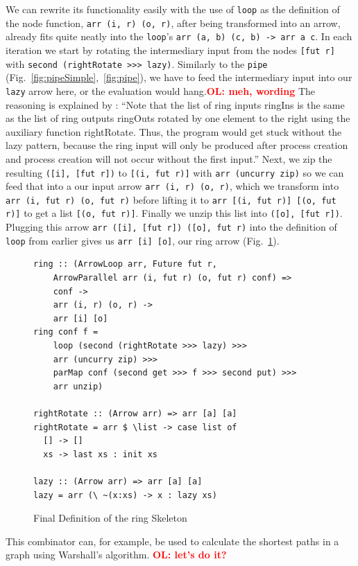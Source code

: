 \documentclass{jfp1}
\renewcommand{\cite}[1]{\citep{#1}}
\newcommand{\inlinecode}[1]{\texttt{#1}}
\newcommand{\comm}[2]{\textcolor{red}{\bfseries #1: #2}}
\newcommand{\olcomment}[1]{\comm{OL}{#1}}
\begin{document}
We can rewrite its functionality easily with the use of \inlinecode{loop} as the definition of the node function, \inlinecode{arr (i, r) (o, r)}, after being transformed into an arrow, already fits quite neatly into the \inlinecode{loop}'s \inlinecode{arr (a, b) (c, b) -> arr a c}. In each iteration we start by rotating the intermediary input from the nodes \inlinecode{[fut r]} with \inlinecode{second (rightRotate >>> lazy)}. Similarly to the \inlinecode{pipe} (Fig.~\ref{fig:pipeSimple},~\ref{fig:pipe}), we have to feed the intermediary input into our \inlinecode{lazy} arrow here, or the evaluation would hang.\olcomment{meh, wording} The reasoning is explained by \citet{Loogen2012}:
\enquote{Note that the list of ring inputs ringIns is the same as the list of ring outputs ringOuts rotated by one element to the right using the auxiliary function rightRotate. Thus, the program would get stuck without the lazy pattern, because the ring input will only be produced after process creation and process creation will not occur without the first input.}
Next, we zip the resulting \inlinecode{([i], [fut r])} to \inlinecode{[(i, fut r)]} with \inlinecode{arr (uncurry zip)} so we can feed that into a our input arrow \inlinecode{arr (i, r) (o, r)}, which we transform into \inlinecode{arr (i, fut r) (o, fut r)} before lifting it to \inlinecode{arr [(i, fut r)] [(o, fut r)]} to get a list \inlinecode{[(o, fut r)]}. Finally we unzip this list into \inlinecode{([o], [fut r])}. Plugging this arrow \inlinecode{arr ([i], [fut r]) ([o], fut r)} into the definition of \inlinecode{loop} from earlier gives us \inlinecode{arr [i] [o]}, our ring arrow (Fig.~\ref{fig:ringFinal}).
\begin{figure}[h]
\begin{lstlisting}[frame=htrbl]
ring :: (ArrowLoop arr, Future fut r,
	ArrowParallel arr (i, fut r) (o, fut r) conf) =>
    conf ->
    arr (i, r) (o, r) ->
    arr [i] [o]
ring conf f =
	loop (second (rightRotate >>> lazy) >>>
    arr (uncurry zip) >>>
    parMap conf (second get >>> f >>> second put) >>>
    arr unzip)

rightRotate :: (Arrow arr) => arr [a] [a]
rightRotate = arr $ \list -> case list of
  [] -> []
  xs -> last xs : init xs

lazy :: (Arrow arr) => arr [a] [a]
lazy = arr (\ ~(x:xs) -> x : lazy xs)
\end{lstlisting}
\caption{Final Definition of the ring Skeleton}
\label{fig:ringFinal}
\end{figure}
This combinator can, for example, be used to calculate the shortest paths in a graph using Warshall's algorithm.
\olcomment{let's do it?}
\end{document}
